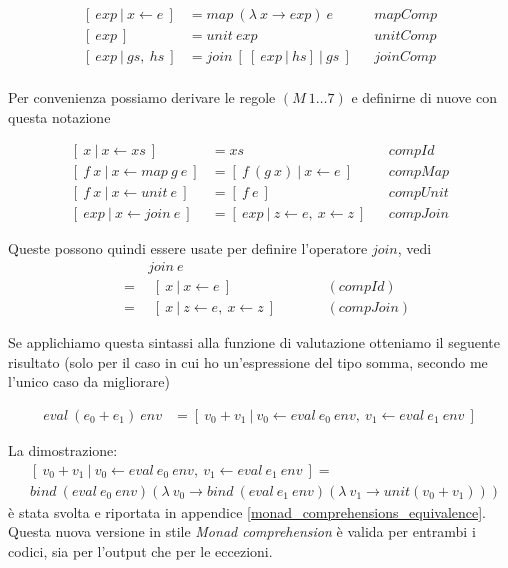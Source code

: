 \begin{align*}
  {[\ exp\  |\  x \leftarrow e\ ]} &= map\ (\lambda\ x \to exp)\ e &&mapComp\\
  {[ \  exp \  ]} &= unit \  exp &&unitComp\\
  {[\ exp\ |\ gs,\ hs\ ]} &= join\ {[\ {[\ exp\ |\ hs]}\ |\ gs\ ]} &&joinComp\\
\end{align*}

Per convenienza possiamo derivare le regole $(M\ 1\dots7)$ e definirne di nuove
con questa notazione

\begin{align*}
  {[\ x\  |\  x \leftarrow xs\ ]} &= xs &&compId\\
  {[\ f\ x\ |\ x \leftarrow map\ g\ e\ ]} &= {[\ f\ (g\ x)\ |\ x \leftarrow e\ ]} &&compMap\\
  {[\ f\ x\ |\ x \leftarrow unit\ e\ ]} &= {[\ f\ e\ ]} &&compUnit\\
  {[\ exp\ |\ x \leftarrow join\ e\ ]} &= {[\ exp\ |\ z \leftarrow e,\ x \leftarrow z\ ]} &&compJoin
\end{align*}

Queste possono quindi essere usate per definire l'operatore $join$, vedi
\begin{align*}
  &\qquad join\ e &&\\
  &=\quad {[\ x\ |\ x \leftarrow e\ ]} &&\qquad(compId)\\
  &=\quad {[\ x\ |\ z \leftarrow e,\ x \leftarrow z\ ]} &&\qquad(compJoin)
\end{align*}

Se applichiamo questa sintassi alla funzione di valutazione otteniamo il
seguente risultato (solo per il caso in cui ho un'espressione del tipo somma,
secondo me l'unico caso da migliorare)

\begin{align*}
  eval\ (e_0 + e_1)\ env &= {[\ v_0 + v_1\ |\
                            v_0 \leftarrow eval\ e_0\ env,\
                            v_1 \leftarrow eval\ e_1\ env\ ]}
\end{align*}

La dimostrazione:
\begin{align*}
  &{[\ v_0 + v_1\ |\ v_0 \leftarrow eval\ e_0\ env,\ v_1 \leftarrow eval\ e_1\ env\ ]} = \\
  &bind\ (eval\ e_0\ env) (\lambda\ v_0 \to bind\ (eval\ e_1\ env) (\lambda\ v_1 \to unit (v_0 + v_1)))
\end{align*}
è stata svolta e riportata in appendice \ref{monad_comprehensions_equivalence}.
Questa nuova versione in stile \textit{Monad comprehension} è valida per
entrambi i codici, sia per l'output che per le eccezioni.

\vfill %
\pagebreak